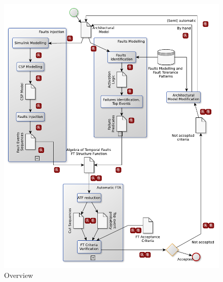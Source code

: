 \begin{figure}[htp]
\begin{center}
  \includegraphics[width=1\textwidth]{StrategyOverview}
  \caption{Overview}
  \label{fig:overview}
\end{center}
\end{figure}